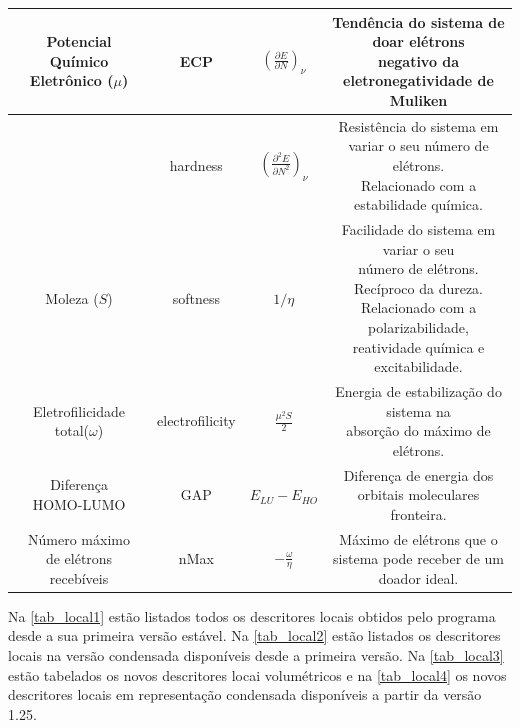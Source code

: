 \documentclass[a4paper,11pt]{refart}
\begin{document}
\begin{minipage}{\fullwidth}
\begin{table}[H]
\begin{tabular}{c|c|c|c}
	\makecell{Potencial Químico\\Eletrônico ($\mu$) }  & ECP  & $\left(\frac{\partial E}{\partial N} \right)_\nu$ & \makecell{Tendência do sistema de doar elétrons\\negativo da eletronegatividade de Muliken}\\\hline			
	\makecell{Dureza ($\eta$)}  & hardness & $\left(\frac{\partial ^2  E}{\partial N ^2} \right)_\nu$ & \makecell{Resistência do sistema em \\variar o seu número de elétrons. \\Relacionado com a estabilidade química.} \\ \hline
Moleza ($S$)  & softness & $1/\eta$ & \makecell{Facilidade do sistema em variar o seu\\ número de elétrons. Recíproco da dureza.\\ Relacionado com a polarizabilidade,\\ reatividade química e excitabilidade.}  \\ \hline
\makecell{Eletrofilicidade\\total($\omega$)} & electrofilicity  & $\frac{\mu^2S}{2}$ & \makecell{ Energia de estabilização do sistema na \\absorção do máximo de elétrons.}   \\ \hline
\makecell{Diferença\\HOMO-LUMO} & GAP & $E_{LU} - E_{HO}$ & \makecell{Diferença de energia dos \\orbitais moleculares fronteira.}  \\\hline
\makecell{Número máximo\\de elétrons\\recebíveis}  & nMax & $-\frac{\omega}{\eta} $ & \makecell{Máximo de elétrons que o\\ sistema pode receber de um doador ideal.}   \\ 
\bottomrule
\end{tabular} 
\label{tab_glob}	
\end{table}	
\end{minipage}

\newpage

Na \autoref{tab_local1} estão listados todos os descritores locais obtidos pelo programa desde a sua primeira versão estável. Na \autoref{tab_local2} estão listados os descritores locais na versão condensada disponíveis desde a primeira versão. Na \autoref{tab_local3} estão tabelados os novos descritores locai volumétricos e na \autoref{tab_local4} os novos descritores locais em representação condensada disponíveis a partir da versão 1.25.
\end{document}
